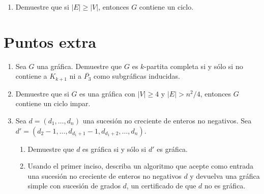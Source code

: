 \documentclass{article}
\begin{document}
\begin{enumerate}
  \textit{\textbf{Soluci\'on:}}
  \begin{itemize}
  \item[$k = 0$)] Son todas las gráficas que no tienen aristas, a estas se les conoce
    como g\'aficas vac\'ias.
  \item[$k = 1$)] Estas son gr\'aficas con una cantidad de v\'ertices par y son tantas
    uniones de $P_2$ como $\frac{|V_G|}{2}$. Las gráficas con $|V_G|$ impar no entran
    aqu\'i porque siempre habr\'a $(|V_G| - 1) P_2$ y alg\'un v\'ertice (aislado) será
    de grado igual a $0$!! (o, pensando en lazos, de grado igual a 2), lo que contradice
    el ser $1-$regular.
  \item[$k = 2$)] Son gr\'aficas que contienen ciclos o son combinaciones de ciclos.
    Todos los ciclos son $2-$regulares, esto no implica que todas las gr\'aficas
    $2-$regulares sean un ciclo pero si que los contengan o que sean combinaciones
    de estos.
  \end{itemize}
  Con los $3$ puntos anteriores concluimos la caracterización. \hfill $\square$
\item Demuestre que si $|E| \ge |V|$, entonces $G$ contiene un ciclo.
\end{enumerate}

\section*{Puntos extra}

\begin{enumerate}
\item Sea $G$ una gr\'afica.   Demuestre que $G$ es $k$-partita completa si y
  s\'olo si no contiene a $K_{k+1}$ ni a $\overline{P_3}$ como subgr\'aficas
  inducidas.
\item Demuestre que si $G$ es una gr\'afica con $|V| \ge 4$ y $|E| > n^2/4$,
  entonces $G$ contiene un ciclo impar.
\item Sea $d = (d_1, \dots, d_n)$ una sucesi\'on no creciente de enteros no
  negativos. Sea $d' = (d_2-1, \dots, d_{d_1+1}-1, d_{d_1+2}, \dots, d_n)$.
  \begin{enumerate}
  \item Demuestre que $d$ es gr\'afica si y s\'olo si $d'$ es gr\'afica.

  \item Usando el primer inciso, describa un algoritmo que acepte como
    entrada una sucesi\'on no creciente de enteros no negativos $d$ y
    devuelva una gr\'afica simple con sucesi\'on de grados $d$, un
    certificado de que $d$ no es gr\'afica.
  \end{enumerate}
\end{enumerate}
\end{document}
